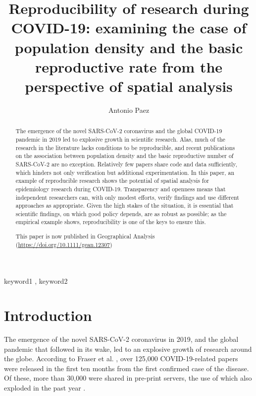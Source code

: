 \documentclass[preprint, 3p,
authoryear]{elsarticle} %
\begin{document}
\begin{frontmatter}

  \title{Reproducibility of research during COVID-19: examining the case
of population density and the basic reproductive rate from the
perspective of spatial analysis}
    \author[McMaster University]{Antonio Paez%
  }
  
  \begin{abstract}
  The emergence of the novel SARS-CoV-2 coronavirus and the global
  COVID-19 pandemic in 2019 led to explosive growth in scientific
  research. Alas, much of the research in the literature lacks
  conditions to be reproducible, and recent publications on the
  association between population density and the basic reproductive
  number of SARS-CoV-2 are no exception. Relatively few papers share
  code and data sufficiently, which hinders not only verification but
  additional experimentation. In this paper, an example of reproducible
  research shows the potential of spatial analysis for epidemiology
  research during COVID-19. Transparency and openness means that
  independent researchers can, with only modest efforts, verify findings
  and use different approaches as appropriate. Given the high stakes of
  the situation, it is essential that scientific findings, on which good
  policy depends, are as robust as possible; as the empirical example
  shows, reproducibility is one of the keys to ensure this.

  This paper is now published in Geographical Analysis
  (\url{https://doi.org/10.1111/gean.12307})
  \end{abstract}
    \begin{keyword}
    keyword1 \sep 
    keyword2
  \end{keyword}
  
 \end{frontmatter}

\newpage

\hypertarget{introduction}{%
\section{Introduction}\label{introduction}}

The emergence of the novel SARS-CoV-2 coronavirus in 2019, and the
global pandemic that followed in its wake, led to an explosive growth of
research around the globe. According to Fraser et al.
\citeyearpar{Fraser2021evolving}, over 125,000 COVID-19-related papers
were released in the first ten months from the first confirmed case of
the disease. Of these, more than 30,000 were shared in pre-print
servers, the use of which also exploded in the past year
\citep{Kwon2021swamped, Vlasschaert2020proliferation, Anazco2021publication}.
\end{document}
